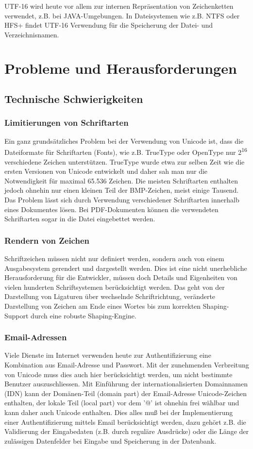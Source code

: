UTF-16 wird heute vor allem zur internen Repräsentation von Zeichenketten verwendet, z.B. bei JAVA-Umgebungen. In Dateisystemen wie z.B. NTFS oder HFS+ findet UTF-16 Verwendung für die Speicherung der Datei- und Verzeichnisnamen.

\section{Probleme und Herausforderungen}

\subsection{Technische Schwierigkeiten}
\subsubsection{Limitierungen von Schriftarten}
Ein ganz grundsätzliches Problem bei der Verwendung von Unicode ist, dass die Dateiformate für Schriftarten (Fonts), wie z.B. TrueType oder OpenType nur 2\textsuperscript{16} verschiedene Zeichen unterstützen. TrueType wurde etwa zur selben Zeit wie die ersten Versionen von Unicode entwickelt und daher sah man nur die Notwendigkeit für maximal 65.536 Zeichen. Die meisten Schriftarten enthalten jedoch ohnehin nur einen kleinen Teil der BMP-Zeichen, meist einige Tausend. Das Problem lässt sich durch Verwendung verschiedener Schriftarten innerhalb eines Dokumentes lösen. Bei PDF-Dokumenten können die verwendeten Schriftarten sogar in die Datei eingebettet werden.

\subsubsection{Rendern von Zeichen}
Schriftzeichen müssen nicht nur definiert werden, sondern auch von einem Ausgabesystem gerendert und dargestellt werden. 
Dies ist eine nicht unerhebliche Herausforderung für die Entwickler, müssen doch Details und Eigenheiten von vielen hunderten Schriftsystemen berücksichtigt werden. Das geht von der Darstellung von Ligaturen über wechselnde Schriftrichtung, veränderte Darstellung von Zeichen am Ende eines Wortes bis zum korrekten Shaping-Support durch eine robuste Shaping-Engine.

\subsubsection{Email-Adressen}
Viele Dienste im Internet verwenden heute zur Authentifizierung eine Kombination aus Email-Adresse und Passwort. Mit der zunehmenden Verbreitung von Unicode muss dies auch hier berücksichtigt werden, um nicht bestimmte Benutzer auszuschliessen. Mit Einführung der internationalisierten Domainnamen (IDN) kann der Domänen-Teil (domain part) der Email-Adresse Unicode-Zeichen enthalten, der lokale Teil (local part) vor dem '@' ist ohnehin frei wählbar und kann daher auch Unicode enthalten. Dies alles muß bei der Implementierung einer Authentifizierung mittels Email berücksichtigt werden, dazu gehört z.B. die Validierung der Eingabedaten (z.B. durch reguläre Ausdrücke) oder die Länge der zulässigen Datenfelder bei Eingabe und Speicherung in der Datenbank.

